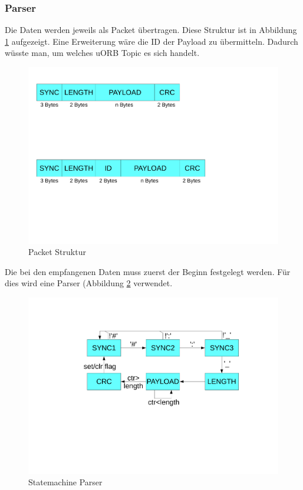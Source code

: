 \subsubsection{Parser}

\noindent Die Daten werden jeweils als Packet übertragen. Diese Struktur ist in Abbildung \ref{fig:packet} aufgezeigt. Eine Erweiterung wäre die ID der Payload zu übermitteln. Dadurch wüsste man, um welches uORB Topic es sich handelt.

\begin{figure}[ht]
  \begin{center}
  \includegraphics[scale=0.5, trim={1cm 16cm 11cm 1cm},clip]{pic/50_app/packet.pdf}
  \caption{Packet Struktur}
  \label{fig:packet}
  \end{center}
\end{figure}

\noindent Die bei den empfangenen Daten muss zuerst der Beginn festgelegt werden. Für dies wird eine Parser (Abbildung \ref{fig:Statemachine Parser} verwendet.


\begin{figure}[ht]
  \begin{center}
  \includegraphics[scale=0.5, trim={1cm 20cm 1cm 1cm},clip]{pic/50_app/statemachine_parser.pdf}
  \caption{Statemachine Parser}
  \label{fig:Statemachine Parser}
  \end{center}
\end{figure}


\clearpage
